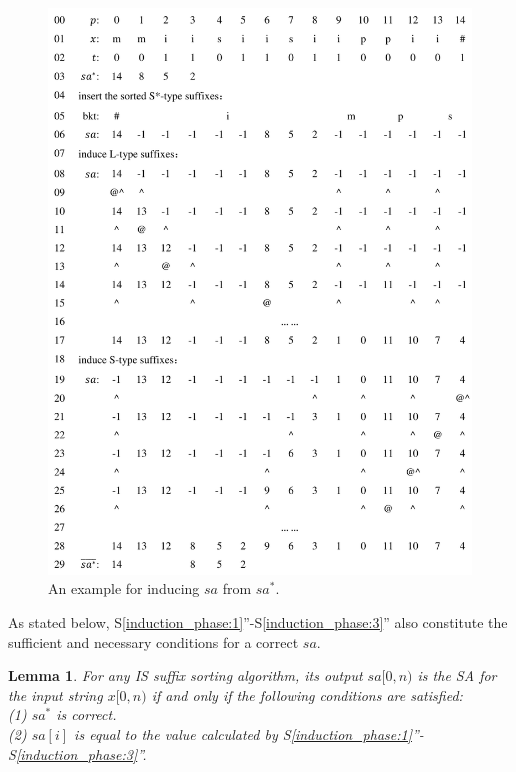 \documentclass[10pt,journal,compsoc]{IEEEtran}
\newtheorem{lemma}[theorem]{Lemma}
\begin{document}
\begin{figure}[t]
	\centering
	
	\includegraphics[width = 1\columnwidth]{example.pdf}
	
	\caption{An example for inducing $sa$ from $sa^*$.}
	
	\label{fig:example1}
	
\end{figure}

As stated below, S\ref{induction_phase:1}''-S\ref{induction_phase:3}'' also constitute the sufficient and necessary conditions for a correct $sa$.

\begin{lemma} \label{lemma:3}
	For any IS suffix sorting algorithm, its output $sa[0, n)$ is the SA for the input string $x[0, n)$ if and only if the following conditions are satisfied: \\ 
	(1) $sa^*$ is correct. \\
	(2) $sa[i]$ is equal to the value calculated by S\ref{induction_phase:1}''-S\ref{induction_phase:3}''. \\
	
\end{lemma}
\end{document}
